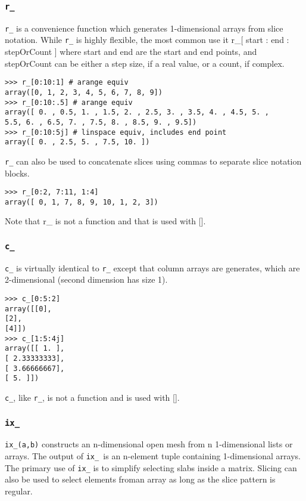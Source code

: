 \documentclass[KSmain.tex]{subfiles}
\begin{document}
\subsubsection{\texttt{r\_}}
\texttt{r\_} is a convenience function which generates 1-dimensional arrays from slice notation. While \texttt{r\_} is highly
flexible, the most common use it r\_[ start : end : stepOrCount ] where start and end are the start and end
points, and stepOrCount can be either a step size, if a real value, or a count, if complex.
\begin{framed}
\begin{verbatim}
>>> r_[0:10:1] # arange equiv
array([0, 1, 2, 3, 4, 5, 6, 7, 8, 9])
>>> r_[0:10:.5] # arange equiv
array([ 0. , 0.5, 1. , 1.5, 2. , 2.5, 3. , 3.5, 4. , 4.5, 5. ,
5.5, 6. , 6.5, 7. , 7.5, 8. , 8.5, 9. , 9.5])
>>> r_[0:10:5j] # linspace equiv, includes end point
array([ 0. , 2.5, 5. , 7.5, 10. ])
\end{verbatim}
\end{framed}
\texttt{r\_} can also be used to concatenate slices using commas to separate slice notation blocks.
\begin{framed}
\begin{verbatim}
>>> r_[0:2, 7:11, 1:4]
array([ 0, 1, 7, 8, 9, 10, 1, 2, 3])
\end{verbatim}
\end{framed}
Note that r\_ is not a function and that is used with [].
\subsubsection{\texttt{c\_}}
\texttt{c\_} is virtually identical to \texttt{r\_} except that column arrays are generates, which are 2-dimensional (second
dimension has size 1).
\begin{framed}
\begin{verbatim}
>>> c_[0:5:2]
array([[0],
[2],
[4]])
>>> c_[1:5:4j]
array([[ 1. ],
[ 2.33333333],
[ 3.66666667],
[ 5. ]])
\end{verbatim}
\end{framed}
\texttt{c\_}, like \texttt{r\_}, is not a function and is used with [].

\subsubsection{\texttt{ix\_}}
\texttt{ix\_(a,b)} constructs an n-dimensional open mesh from n 1-dimensional lists or arrays. The output of
\texttt{ix\_ }is an n-element tuple containing 1-dimensional arrays. The primary use of \texttt{ix\_} is to simplify selecting
slabs inside a matrix. Slicing can also be used to select elements froman array as long as the slice pattern is
regular. 
\end{document}
